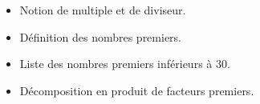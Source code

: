\begin{prerequis}[Prérequis]    
    \begin{itemize}
        \item Notion de multiple et de diviseur.
        \item Définition des nombres premiers.
        \item Liste des nombres premiers inférieurs à 30.
        \item Décomposition en produit de facteurs premiers.
    \end{itemize}
\end{prerequis}
